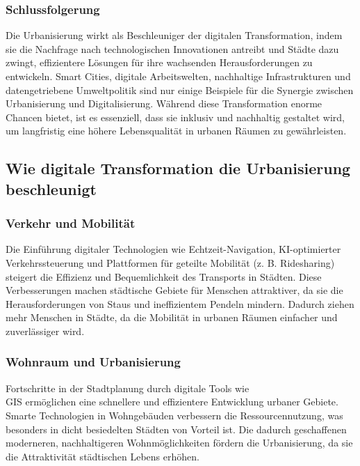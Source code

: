 \documentclass[conference,compsoc,final,a4paper, onecolumn, 11pt]{IEEEtran}
\begin{document}
\subsubsection{Schlussfolgerung}
Die Urbanisierung wirkt als Beschleuniger der digitalen Transformation, indem sie die Nachfrage nach technologischen Innovationen antreibt und Städte dazu zwingt, effizientere Lösungen für ihre wachsenden Herausforderungen zu entwickeln. 
Smart Cities, digitale Arbeitswelten, nachhaltige Infrastrukturen und datengetriebene Umweltpolitik sind nur einige Beispiele für die Synergie zwischen Urbanisierung und Digitalisierung. 
Während diese Transformation enorme Chancen bietet, ist es essenziell, dass sie inklusiv und nachhaltig gestaltet wird, um langfristig eine höhere Lebensqualität in urbanen Räumen zu gewährleisten.


\subsection{Wie digitale Transformation die Urbanisierung beschleunigt}
\subsubsection{Verkehr und Mobilität}
Die Einführung digitaler Technologien wie Echtzeit-Navigation, \ac{KI}-optimierter Verkehrssteuerung und Plattformen für geteilte Mobilität (z. B. Ridesharing) steigert die Effizienz und Bequemlichkeit des Transports in Städten. 
Diese Verbesserungen machen städtische Gebiete für Menschen attraktiver, da sie die Herausforderungen von Staus und ineffizientem Pendeln mindern. 
Dadurch ziehen mehr Menschen in Städte, da die Mobilität in urbanen Räumen einfacher und zuverlässiger wird. \autocite{mckinsey_global_institute_smart_2021}

\subsubsection{Wohnraum und Urbanisierung}
Fortschritte in der Stadtplanung durch digitale Tools wie \\ \ac{GIS} ermöglichen eine schnellere und effizientere Entwicklung urbaner Gebiete. 
Smarte Technologien in Wohngebäuden verbessern die Ressourcennutzung, was besonders in dicht besiedelten Städten von Vorteil ist. 
Die dadurch geschaffenen moderneren, nachhaltigeren Wohnmöglichkeiten fördern die Urbanisierung, da sie die Attraktivität städtischen Lebens erhöhen. \autocite{un_habitat_world_2022}
\end{document}

